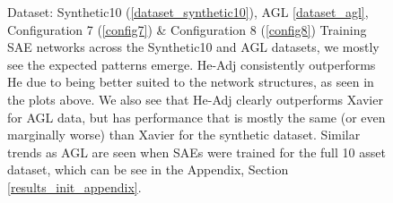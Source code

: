 \documentclass[a4paper,11pt,oneside]{article}
\theoremstyle{plain}
\theoremstyle{definition}
\begin{document}
\begin{figure}[H]
\begin{subfigure}{.5\textwidth}
		\label{figure-agl_mse_init}
	\end{subfigure}
	\caption[SAE MSE by Weight Initialization]{Dataset: Synthetic10 (\ref{dataset_synthetic10}), AGL \ref{dataset_agl}, Configuration 7 (\ref{config7}) \& Configuration 8 (\ref{config8})
		\newline Training SAE networks across the Synthetic10 and AGL  datasets, we mostly see the expected patterns emerge. He-Adj consistently outperforms He due to being better suited to the network structures, as seen in the plots above. We also see that He-Adj clearly outperforms Xavier for AGL data, but has performance that is mostly the same (or even marginally worse) than Xavier for the synthetic dataset. Similar trends as AGL are seen when SAEs were trained for the full 10 asset dataset, which can be see in the Appendix, Section \ref{results_init_appendix}.}
	\label{figure-mse_init}
\end{figure}
\end{document}
